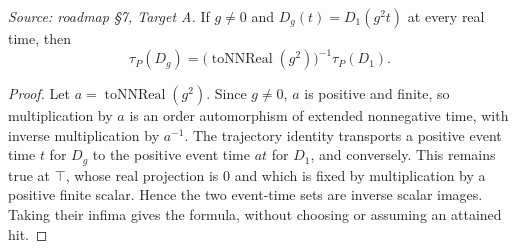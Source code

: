 \begin{theorem}
\label{thm:kinetic:first-state-hit-rescale}
%
\textit{Source: roadmap \S7, Target A.}
If $g\ne0$ and $D_g(t)=D_1(g^2t)$ at every real time, then
\[
 \tau_P(D_g)=\bigl(\operatorname{toNNReal}(g^2)\bigr)^{-1}\tau_P(D_1).
\]
\end{theorem}
\begin{proof}


\leanok
Let $a=\operatorname{toNNReal}(g^2)$.  Since $g\ne0$, $a$ is positive and
finite, so multiplication by $a$ is an order automorphism of extended
nonnegative time, with inverse multiplication by $a^{-1}$.  The trajectory
identity transports a positive event time $t$ for $D_g$ to the positive event
time $at$ for $D_1$, and conversely.  This remains true at $\top$, whose real
projection is $0$ and which is fixed by multiplication by a positive finite
scalar.  Hence the two event-time sets are inverse scalar images.  Taking
their infima gives the formula, without choosing or assuming an attained hit.
\end{proof}
